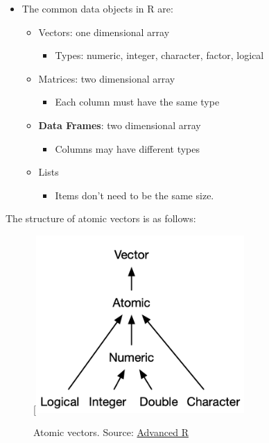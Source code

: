 \documentclass[
  letterpaper,
  DIV=11,
  numbers=noendperiod]{scrartcl}
\providecommand{\tightlist}{%
  \setlength{\itemsep}{0pt}\setlength{\parskip}{0pt}}\usepackage{longtable,booktabs,array}
\begin{document}
\begin{itemize}
\tightlist
\item
  The common data objects in R are:

  \begin{itemize}
  \tightlist
  \item
    Vectors: one dimensional array

    \begin{itemize}
    \tightlist
    \item
      Types: numeric, integer, character, factor, logical
    \end{itemize}
  \item
    Matrices: two dimensional array

    \begin{itemize}
    \tightlist
    \item
      Each column must have the same type
    \end{itemize}
  \item
    \textbf{Data Frames}: two dimensional array

    \begin{itemize}
    \tightlist
    \item
      Columns may have different types
    \end{itemize}
  \item
    Lists

    \begin{itemize}
    \tightlist
    \item
      Items don't need to be the same size.
    \end{itemize}
  \end{itemize}
\end{itemize}

The structure of atomic vectors is as follows:

\begin{figure}

{\centering 

{[}\includegraphics[width=3.125in,height=\textheight]{images/summary-tree-atomic.png}

}

\caption{\label{fig-style}Atomic vectors. Source:
\href{https://adv-r.hadley.nz/index.html}{Advanced R}}

\end{figure}
\end{document}
